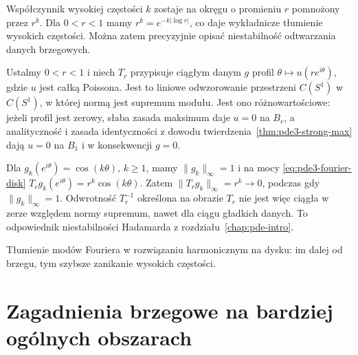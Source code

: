 Współczynnik wysokiej częstości $k$ zostaje
na okręgu o promieniu $r$ pomnożony przez $r^k$.
Dla $0<r<1$ mamy $r^k=e^{-k|\log r|}$, co daje
wykładnicze tłumienie wysokich częstości.
Można zatem precyzyjnie opisać niestabilność
odtwarzania danych brzegowych.

Ustalmy $0<r<1$ i niech $T_r$ przypisuje ciągłym
danym $g$ profil $\theta\mapsto u(re^{i\theta})$,
gdzie $u$ jest całką Poissona. Jest to liniowe
odwzorowanie przestrzeni $C(S^1)$ w $C(S^1)$,
w której normą jest supremum modułu.
Jest ono różnowartościowe: jeżeli profil jest
zerowy, słaba zasada maksimum daje $u=0$
na $B_r$, a analityczność i zasada identyczności
z dowodu twierdzenia~\ref{thm:pde3-strong-max}
dają $u=0$ na $B_1$ i w konsekwencji $g=0$.

Dla $g_k(e^{i\theta})=\cos(k\theta)$, $k\geq1$,
mamy $\|g_k\|_\infty=1$ i na mocy
\eqref{eq:pde3-fourier-disk}
$T_rg_k(e^{i\theta})=r^k\cos(k\theta)$.
Zatem $\|T_rg_k\|_\infty=r^k\to0$,
podczas gdy $\|g_k\|_\infty=1$.
Odwrotność $T_r^{-1}$ określona na obrazie $T_r$
nie jest więc ciągła w zerze względem normy
supremum, nawet dla ciągu gładkich danych.
To odpowiednik niestabilności Hadamarda
z rozdziału~\ref{chap:pde-intro}.

\begin{center}
\begin{minipage}{\linewidth}
\centering
{}
\par\smallskip\small
Tłumienie modów Fouriera w rozwiązaniu harmonicznym
na dysku: im dalej od brzegu, tym szybsze zanikanie
wysokich częstości.
\end{minipage}
\end{center}

\section{Zagadnienia brzegowe na bardziej ogólnych obszarach}
\label{sec:pde3-general-domain}

